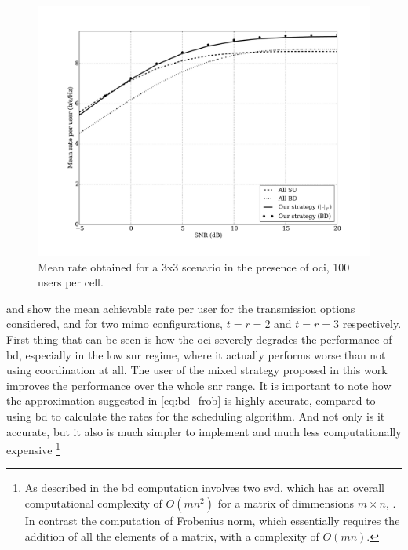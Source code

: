 \begin{figure}[t]
\centering
\includegraphics[width=0.75\columnwidth]{./12.simple_threshold_scheduling/figure/mean_rate_03x03_100user_bd}
\caption{Mean rate obtained for a 3x3 scenario in the presence of \gls{oci}, 100
users per cell.}
\label{fig:mean_rate_3x3}
\end{figure}

 and  show the mean achievable
rate per user for the transmission options considered, and for two \gls{mimo}
configurations, $t=r=2$ and $t=r=3$ respectively. First thing that can be seen
is how the \gls{oci} severely degrades the performance of \gls{bd}, especially
in the low \gls{snr} regime, where it actually performs worse than not using
coordination at all. The user of the mixed strategy proposed in this work
improves the performance over the whole \gls{snr} range. It is important to note
how the approximation suggested in \eqref{eq:bd_frob} is highly accurate,
compared to using \gls{bd} to calculate the rates for the scheduling algorithm.
And not only is it accurate, but it also is much simpler to implement and much
less computationally expensive
\footnote{As described in  the \gls{bd} computation
involves two \gls{svd}, which has an overall computational complexity of
$O\left(mn^2\right)$ for a matrix of dimmensions $m \times n$,
\cite{golub2012matrix}. In contrast the computation of Frobenius norm, which
essentially requires the addition of all the elements of a matrix, with a
complexity of $O\left(mn\right)$.}

